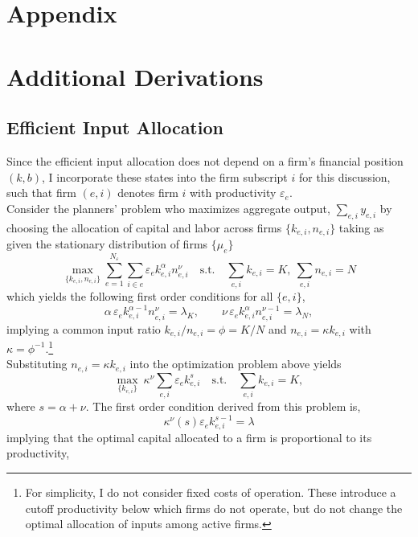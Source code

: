 \documentclass[12pt]{article}
\begin{document}
\newpage

\appendix

\setcounter{table}{0}
\renewcommand{\thetable}{A\arabic{table}}

\section*{Appendix  \label{sec: mathapp}}



\section{Additional Derivations}
\subsection{Efficient Input Allocation  \label{sec: efficient allocation}}
Since the efficient input allocation does not depend on a firm’s financial position $(k,b)$, I incorporate these states into the firm subscript $i$ for this discussion, such that firm $(e,i)$ denotes firm $i$ with productivity $\varepsilon_e$.\vspace{3mm} \\
Consider the planners' problem who maximizes aggregate output, $\sum_{e,i} y_{e,i}$ by choosing the allocation of capital and labor across firms $\{k_{e,i},n_{e,i}\}$ taking as given the stationary distribution of firms $\{\mu_e\}$
$$
\max_{\{k_{e,i},n_{e,i}\}} \sum_{e=1}^{N_\varepsilon}\sum_{i\in e}\varepsilon_e k_{e,i}^{\alpha}n_{e,i}^{\nu}
\quad\text{s.t.}\quad \sum_{e,i}k_{e,i}=K,\ \sum_{e,i}n_{e,i}=N $$ 
which yields the following first order conditions for all $\{e,i\}$,
\[
\alpha\,\varepsilon_e k_{e,i}^{\alpha-1}n_{e,i}^{\nu}=\lambda_K,\qquad
\nu\,\varepsilon_e k_{e,i}^{\alpha}n_{e,i}^{\nu-1}=\lambda_N,
\]
implying a common input ratio $k_{e,i}/n_{e,i}=\phi=K/N$ and $n_{e,i}=\kappa k_{e,i}$ with $\kappa=\phi^{-1}$.\footnote{For simplicity, I do not consider fixed costs of operation. These introduce a cutoff productivity below which firms do not operate, but do not change the optimal allocation of inputs among active firms.} \\
Substituting $n_{e,i}=\kappa k_{e,i}$ into the optimization problem above yields
\[
\max_{\{k_{e,i}\}}\ \kappa^{\nu}\sum_{e,i}\varepsilon_e k_{e,i}^{s}\quad\text{s.t.}\quad \sum_{e,i}k_{e,i}=K,
\]
where $s = \alpha + \nu$. The first order condition derived from this problem is, 
$$ \kappa^{\nu} (s) \varepsilon_e k_{e,i}^{s - 1} = \lambda $$
implying that the optimal capital allocated to a firm is proportional to its productivity,
\end{document}
